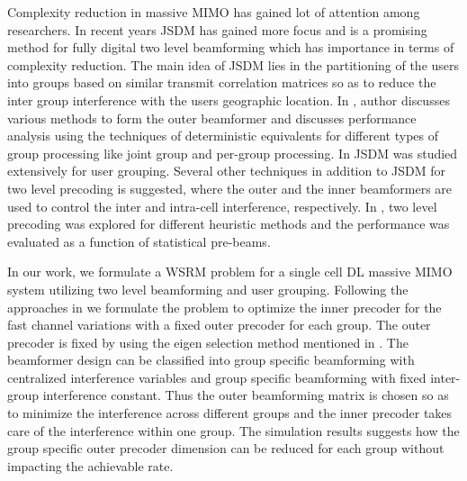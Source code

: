 \documentclass{article}
\begin{document}
Complexity reduction in massive \ac{MIMO} has gained lot of attention among researchers. In recent years \ac{JSDM} has gained more focus and is a promising method for fully digital two level beamforming \cite{adhikary2013joint} which has importance in terms of complexity reduction. The main idea of \ac{JSDM} lies in the partitioning of the users into groups based on similar transmit correlation matrices so as to reduce the inter group interference with the users geographic location. In \cite{adhikary2013joint}, author discusses various methods to form the outer beamformer and discusses performance analysis using the techniques of deterministic equivalents for different types of group processing like joint group and per-group processing. In \cite{nam2014joint, nam2015user, xu2014user} \ac{JSDM} was studied extensively for user grouping. %
Several other techniques in addition to \ac{JSDM} for two level precoding is suggested, where \cite{liu2014hierarchical} the outer and the inner beamformers are used to control the inter and intra-cell interference, respectively. In \cite{arvola2016two}, two level precoding was explored for different heuristic methods and the performance was evaluated as a function of statistical pre-beams. 

In our work, we formulate a \ac{WSRM} problem for a single cell \ac{DL} massive \ac{MIMO} system utilizing two level beamforming and user grouping. Following the approaches in \cite{venkatraman2017jp} we formulate the problem to optimize the inner precoder for the fast channel variations with a fixed outer precoder for each group. The outer precoder is fixed by using the eigen selection method mentioned in \cite{arvola2016two}. The beamformer design can be classified into group specific beamforming with centralized interference variables and group specific beamforming with fixed inter-group interference constant. Thus the outer beamforming matrix is chosen so as to minimize the interference across different groups and the inner precoder takes care of the interference within one group. The simulation results suggests how the group specific outer precoder dimension can be reduced for each group without impacting the achievable rate. 

\vspace{-1eM}
\end{document}
